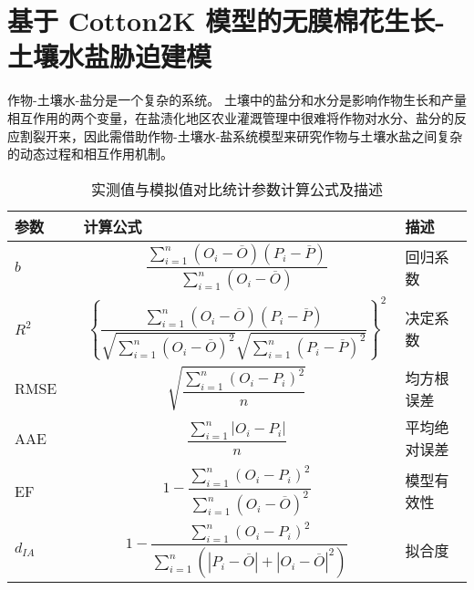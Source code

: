 \chapter{基于 Cotton2K 模型的无膜棉花生长-土壤水盐胁迫建模}
作物-土壤水-盐分是一个复杂的系统。
土壤中的盐分和水分是影响作物生长和产量相互作用的两个变量，在盐渍化地区农业灌溉管理中很难将作物对水分、盐分的反应割裂开来，因此需借助作物-土壤水-盐系统模型来研究作物与土壤水盐之间复杂的动态过程和相互作用机制。
\begin{table}
    \caption{实测值与模拟值对比统计参数计算公式及描述}
    \begin{tabular}{p{0.15\linewidth}p{0.7\linewidth}p{0.15\linewidth}}
        \toprule
        参数     & 计算公式                                                                                                                                                                      & 描述         \\
        \midrule
        $b$      & $$\frac{\sum_{i=1}^n (O_i - \overline{O}) (P_i - \overline{P})}{\sum_{i=1}^n (O_i - \overline{O})}$$                                                                          & 回归系数     \\
        $R^2$    & $$\left \{ \frac{\sum_{i=1}^n (O_i - \overline{O}) (P_i - \overline{P})}{\sqrt{\sum_{i=1}^n (O_i - \overline{O})^2} \sqrt{\sum_{i=1}^n (P_i - \overline{P})^2}} \right \}^2$$ & 决定系数     \\
        RMSE     & $$\sqrt{\frac{\sum_{i=1}^n (O_i - P_i)^2}{n}}$$                                                                                                                               & 均方根误差   \\
        AAE      & $$\frac{\sum_{i=1}^n |O_i - P_i|}{n}$$                                                                                                                                        & 平均绝对误差 \\
        EF       & $$1 - \frac{\sum_{i=1}^n (O_i - P_i)^2}{\sum_{i=1}^n (O_i - \overline{O})^2}$$                                                                                                & 模型有效性   \\
        $d_{IA}$ & $$1 - \frac{\sum_{i=1}^n (O_i - P_i)^2}{\sum_{i=1}^n (|P_i - \overline{O}| + |O_i - \overline{O}|^2)}$$                                                                         & 拟合度       \\
        \bottomrule
    \end{tabular}
\end{table}


